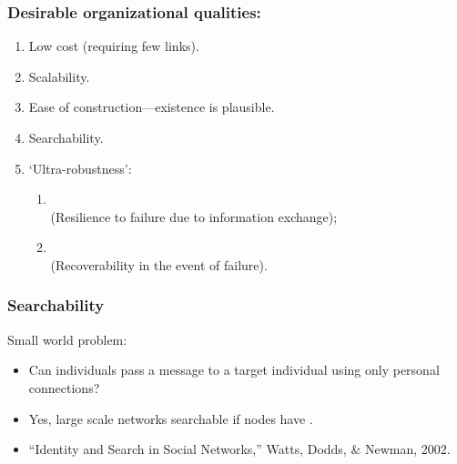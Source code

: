 \begin{frame}
  \frametitle{Desirable organizational qualities:}

  \begin{block}{}
    \begin{enumerate}
    \item<1->
      Low cost (requiring few links).
    \item<2->
      Scalability.
    \item<3->
      Ease of construction---existence is plausible.
    \item<4->
      Searchability.
    \item<5-> 
      \alert{`Ultra-robustness'}:
      \begin{enumerate}
      \item<6->[I]
        \\
        (Resilience to failure due to information exchange);
      \item<7->[II] 
        \\
        (Recoverability in the event of failure).
      \end{enumerate}
    \end{enumerate}
  \end{block}

\end{frame}



\begin{frame}
  \frametitle{Searchability}

  \begin{block}{Small world problem:}
    \begin{itemize}
    \item<1->
      Can individuals pass a message
      to a target individual using only personal connections?
    \item<1->
      Yes, large scale networks searchable 
      if nodes have .
    \item<1->
      ``Identity and Search in Social Networks,''
      Watts, Dodds, \& Newman, 2002.\cite{watts2002b}
    \end{itemize}
  \end{block}


\end{frame}

